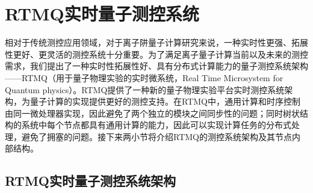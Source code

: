 




\section[RTMQ实时量子测控系统]{RTMQ实时量子测控系统\label{section:rtmq_structure}}

相对于传统测控应用领域，对于离子阱量子计算研究来说，一种实时性更强、拓展性更好、更灵活的测控系统十分重要。为了满足离子量子计算当前以及未来的测控需求，我们提出了一种实时性拓展性好、具有分布式计算能力的量子测控系统架构——RTMQ（用于量子物理实验的实时微系统，Real Time Microsystem for Quantum physics）。RTMQ提供了一种新的量子物理实验平台实时测控系统架构，为量子计算的实现提供更好的测控支持。在RTMQ中，通用计算和时序控制由同一微处理器实现，因此避免了两个独立的模块之间同步性的问题；同时树状结构的系统中每个节点都具有通用计算的能力，因此可以实现计算任务的分布式处理，避免了拥塞的问题\cite[]{junhua01}。接下来两小节将介绍RTMQ的测控系统架构及其节点内部结构。


\subsection[RTMQ实时量子测控系统架构]{RTMQ实时量子测控系统架构\label{section:rtmq_architecture}}

